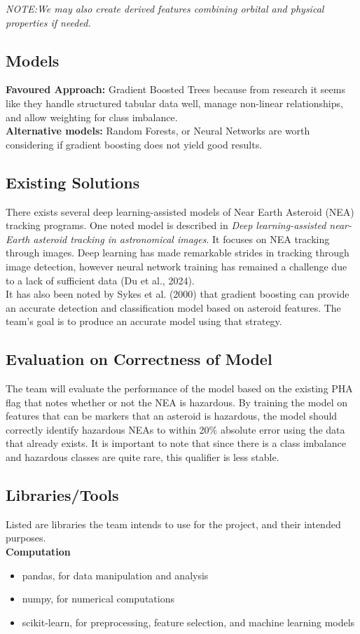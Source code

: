 \documentclass{article}
\begin{document}
\emph{NOTE:We may also create derived features combining orbital and physical properties if needed.}


\subsection*{Models}
\medskip
\textbf{Favoured Approach:} Gradient Boosted Trees because from research it seems like they handle structured tabular data well, manage non-linear relationships, and allow weighting for class imbalance. \\
\medskip
\textbf{Alternative models:} Random Forests, or Neural Networks are worth considering if gradient boosting does not yield good results.

\medskip

\subsection*{Existing Solutions}
\medskip
There exists several deep learning-assisted models of Near Earth Asteroid (NEA) tracking programs. One noted model is described in \textit{Deep learning-assisted near-Earth asteroid tracking in astronomical images}. It focuses on NEA tracking through images. Deep learning has made remarkable strides in tracking through image detection, however neural network training has remained a challenge due to a lack of sufficient data (Du et al., 2024). \\

It has also been noted by Sykes et al. (2000) that gradient boosting can provide an accurate detection and classification model based on asteroid features. The team's goal is to produce an accurate model using that strategy. 

\subsection*{Evaluation on Correctness of Model}

The team will evaluate the performance of the model based on the existing PHA flag that notes whether or not the NEA is hazardous. By training the model on features that can be markers that an asteroid is hazardous, the model should correctly identify hazardous NEAs to within 20\% absolute error using the data that already exists. It is important to note that since there is a class imbalance and hazardous classes are quite rare, this qualifier is less stable. 

\subsection*{Libraries/Tools}
Listed are libraries the team intends to use for the project, and their intended purposes. \\
\textbf{Computation}
\begin{itemize}
    \item pandas, for data manipulation and analysis
    \item numpy, for numerical computations
    \item scikit-learn, for preprocessing, feature selection, and machine learning models
\end{itemize}
\end{document}
